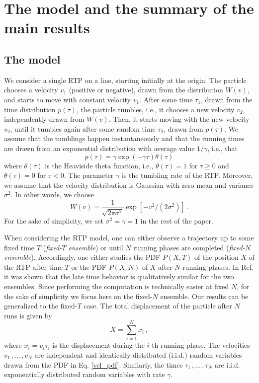 \documentclass[aps,pre,twocolumn,superscriptaddress,showpacs]{revtex4-1}
\newcommand{\be}{\begin{equation}}
\newcommand{\ee}{\end{equation}}
\begin{document}
\section{The model and the summary of the main results}
\label{sec:model-results}

\subsection{ The model}

We consider a single RTP on a line, starting initially at the origin. The particle chooses a velocity $v_1$ (positive or negative), drawn from the distribution $W(v)$, and starts to move with constant velocity $v_1$. After some time $\tau_1$, drawn from the time distribution $p(\tau)$, the particle tumbles, i.e., it chooses a new velocity $v_2$, independently drawn from $W(v)$. Then, it starts moving with the new velocity $v_2$, until it tumbles again after some random time $\tau_2$, drawn from $p(\tau)$. We assume that the tumblings happen instantaneously and that the running times are drawn from an exponential distribution with average value $1/\gamma$, i.e., that
\be
p(\tau) = \gamma\exp(-\gamma \tau)\theta(\tau)
\label{duration_pdf}
\ee
where $\theta(\tau)$ is the Heaviside theta function, i.e., $\theta(\tau)=1$ for 
$\tau\ge 0$ and $\theta(\tau)=0$ for $\tau<0$. The parameter $\gamma$ is the tumbling rate of the RTP. Moreover, we assume that the velocity distribution is Gaussian with zero mean and variance $\sigma^2$. In other words, we choose
\begin{equation}
W(v) = \frac{1}{\sqrt{2\pi\sigma^2}} \exp\left[ -v^2/(2\sigma^2)\right] \,.
\label{vel_pdf} 
\end{equation}
 For the sake of simplicity, we set $\sigma^2=\gamma=1$ in the rest of the paper.
 
 
When considering the RTP model, one can either observe a trajectory up to some fixed time $T$ (\emph{fixed-$T$ ensemble}) or until $N$ running phases are completed (\emph{fixed-$N$ ensemble}). Accordingly, one either studies the PDF $P(X,T)$ of the position $X$ of the RTP after time $T$ or the PDF $P(X,N)$ of $X$ after $N$ running phases. In Ref. \cite{MLDM21} it was shown that the late time behavior is qualitatively similar for the two ensembles. Since performing the computation is technically easier at fixed $N$, for the sake of simplicity we focus here on the fixed-$N$ ensemble. Our results can be generalized to the fixed-$T$ case. The total displacement of the particle after $N$ runs is given by
\be X= \sum_{i=1}^N x_i\,,
\label{eq:Xacc}
\ee
where $x_i=v_i\tau_i$ is the displacement during the $i$-th running phase. The velocities $v_1\,,\ldots\,,v_N$ are independent and identically distributed (i.i.d.) random variables drawn from the PDF in Eq. \eqref{vel_pdf}. Similarly, the times $\tau_1\,,\ldots\,,\tau_N$ are i.i.d. exponentially distributed random variables with rate $\gamma$. 
\end{document}
